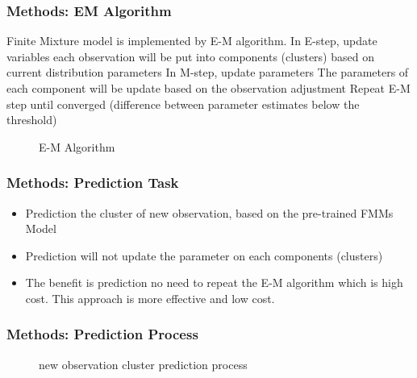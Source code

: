 \documentclass[xcolor=svgnames]{beamer}
\begin{document}

\begin{frame}\frametitle{Methods: EM Algorithm}

  Finite Mixture model is implemented by E-M algorithm.
In E-step, update variables
each observation will be put into components (clusters) based on current distribution parameters
In M-step, update parameters
The parameters of each component will be update based on the observation adjustment
Repeat E-M step until converged (difference between parameter estimates below the threshold)


\begin{figure}
  \centering
  \caption{E-M Algorithm~\cite{phdthesis}}
\end{figure}

\end{frame}


\begin{frame}\frametitle{Methods: Prediction Task}

  \begin{itemize}
    \item Prediction the cluster of new observation, based on the pre-trained FMMs Model
    \item Prediction will not update the parameter on each components (clusters)
    \item The benefit is prediction no need to repeat the E-M algorithm which is high cost. This approach is more effective and low cost. 
    
  \end{itemize}

\end{frame}


\begin{frame}\frametitle{Methods: Prediction Process}

  \begin{figure}
    \centering
    \caption{new observation cluster prediction process}
  \end{figure}

\end{frame}
\end{document}
